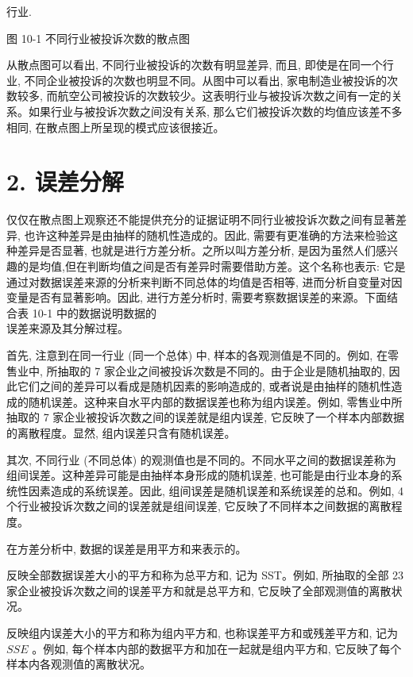 \documentclass[10pt]{article}
\begin{document}
\begin{CJK*}{UTF8}{bsmi}
\begin{center}
\end{center}

行业.

图 10-1 不同行业被投诉次数的散点图

从散点图可以看出, 不同行业被投诉的次数有明显差异, 而且, 即使是在同一个行业, 不同企业被投诉的次数也明显不同。从图中可以看出, 家电制造业被投诉的次数较多, 而航空公司被投诉的次数较少。这表明行业与被投诉次数之间有一定的关系。如果行业与被投诉次数之间没有关系, 那么它们被投诉次数的均值应该差不多相同, 在散点图上所呈现的模式应该很接近。

\section*{2. 误差分解}
仅仅在散点图上观察还不能提供充分的证据证明不同行业被投诉次数之间有显著差异, 也许这种差异是由抽样的随机性造成的。因此, 需要有更准确的方法来检验这种差异是否显著, 也就是进行方差分析。之所以叫方差分析, 是因为虽然人们感兴趣的是均值,但在判断均值之间是否有差异时需要借助方差。这个名称也表示: 它是通过对数据误差来源的分析来判断不同总体的均值是否相等, 进而分析自变量对因变量是否有显著影响。因此, 进行方差分析时, 需要考察数据误差的来源。下面结合表 10-1 中的数据说明数据的\\
误差来源及其分解过程。

首先, 注意到在同一行业 (同一个总体) 中, 样本的各观测值是不同的。例如, 在零售业中, 所抽取的 7 家企业之间被投诉次数是不同的。由于企业是随机抽取的, 因此它们之间的差异可以看成是随机因素的影响造成的, 或者说是由抽样的随机性造成的随机误差。这种来自水平内部的数据误差也称为组内误差。例如, 零售业中所抽取的 7 家企业被投诉次数之间的误差就是组内误差, 它反映了一个样本内部数据的离散程度。显然, 组内误差只含有随机误差。

其次, 不同行业 (不同总体) 的观测值也是不同的。不同水平之间的数据误差称为组间误差。这种差异可能是由抽样本身形成的随机误差, 也可能是由行业本身的系统性因素造成的系统误差。因此, 组间误差是随机误差和系统误差的总和。例如, 4 个行业被投诉次数之间的误差就是组间误差, 它反映了不同样本之间数据的离散程度。

在方差分析中, 数据的误差是用平方和来表示的。

反映全部数据误差大小的平方和称为总平方和, 记为 SST。例如, 所抽取的全部 23 家企业被投诉次数之间的误差平方和就是总平方和, 它反映了全部观测值的离散状况。

反映组内误差大小的平方和称为组内平方和, 也称误差平方和或残差平方和, 记为 $S S E$ 。例如, 每个样本内部的数据平方和加在一起就是组内平方和, 它反映了每个样本内各观测值的离散状况。


\end{CJK*}
\end{document}
